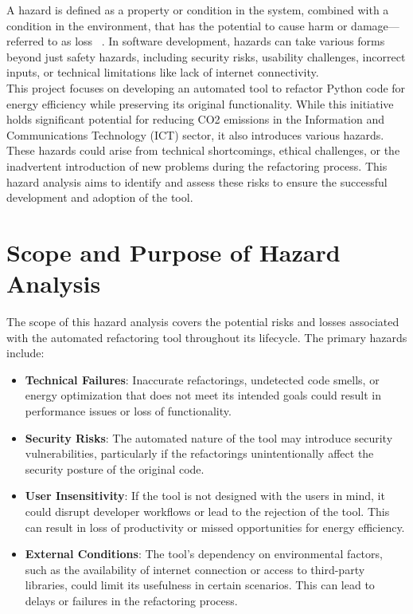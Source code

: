 \documentclass{article}
\newcounter{hazard}
\begin{document}
A hazard is defined as a property or condition in the system, 
combined with a condition in the environment, that has the potential to cause harm 
or damage—referred to as loss ~\citep{Leveson2021}. In software development, hazards can take various 
forms beyond just safety hazards, including security risks, usability challenges, 
incorrect inputs, or technical limitations like lack of internet connectivity.
\\

This project focuses on developing an automated tool to refactor Python code 
for energy efficiency while preserving its original functionality. While this 
initiative holds significant potential for reducing CO2 emissions in the 
Information and Communications Technology (ICT) sector, it also introduces 
various hazards. These hazards could arise from technical shortcomings, ethical 
challenges, or the inadvertent introduction of new problems during the refactoring 
process. This hazard analysis aims to identify and assess these risks to ensure 
the successful development and adoption of the tool.

\section{Scope and Purpose of Hazard Analysis}

The scope of this hazard analysis covers the potential risks and losses associated 
with the automated refactoring tool throughout its lifecycle. The primary hazards include:

\begin{itemize}

    \item \textbf{Technical Failures}: Inaccurate refactorings, undetected code 
    smells, or energy optimization that does not meet its intended goals could 
    result in performance issues or loss of functionality. 

    \item \textbf{Security Risks}: The automated nature of the tool may introduce 
    security vulnerabilities, particularly if the refactorings unintentionally 
    affect the security posture of the original code.

    \item \textbf{User Insensitivity}: If the tool is not designed with the users 
    in mind, it could disrupt developer workflows or lead to the rejection of the 
    tool. This can result in loss of productivity or missed opportunities for 
    energy efficiency.

    \item \textbf{External Conditions}: The tool’s dependency on environmental 
    factors, such as the availability of internet connection or access to 
    third-party libraries, could limit its usefulness in certain scenarios. 
    This can lead to delays or failures in the refactoring process.

\end{itemize}
\end{document}
